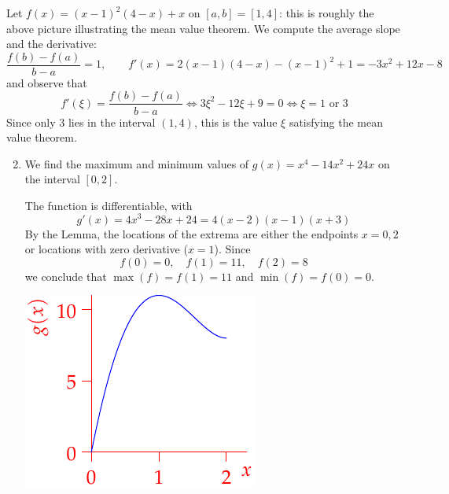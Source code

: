 \begin{examples}{}{}
\exstart Let $f(x)=(x-1)^2(4-x)+x$ on $[a,b]=[1,4]$: this is roughly the above picture illustrating the mean value theorem. We compute the average slope and the derivative:
	\[\frac{f(b)-f(a)}{b-a}=1,\qquad f'(x)=2(x-1)(4-x)-(x-1)^2+1 =-3x^2+12x-8\]
	and observe that
	\[f'(\xi)=\frac{f(b)-f(a)}{b-a}\iff 3\xi^2-12\xi+9=0\iff \xi=1\text{ or }3\]
	Since only 3 lies in the interval $(1,4)$, this is the value $\xi$ satisfying the mean value theorem.
\begin{enumerate}\setcounter{enumi}{1}
  \item We find the maximum and minimum values of $g(x)=x^4-14x^2+24x$ on the interval $[0,2]$.\vspace{-8pt}
  
  \begin{minipage}[t]{0.68\linewidth}\vspace{0pt}
  The function is differentiable, with
  \[g'(x)=4x^3-28x+24=4(x-2)(x-1)(x+3)\]
  By the Lemma, the locations of the extrema are either the endpoints $x=0,2$ or locations with zero derivative ($x=1$). Since
  \[f(0)=0,\quad f(1)=11,\quad f(2)=8\]
  we conclude that $\max(f)=f(1)=11$ and $\min(f)=f(0)=0$.
  \end{minipage}\begin{minipage}[t]{0.32\linewidth}\vspace{0pt}
  \flushright\includegraphics{mvt-ex}
  \end{minipage}
%   
\end{enumerate}
\end{examples}

